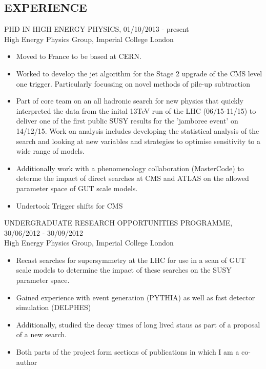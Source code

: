 \documentclass[9pt]{res} %
\begin{document}
\begin{resume}
\section{EXPERIENCE} 
\vspace{0.2cm}
PHD IN HIGH ENERGY PHYSICS, 01/10/2013 - present \\
\vspace{0.1cm}
High Energy Physics Group, Imperial College London 
   \begin{itemize} \itemsep -2pt  %
   \item Moved to France to be based at CERN. 
   \item Worked to develop the jet algorithm for the Stage 2 upgrade of the CMS level one trigger. Particularly focussing on novel methods of pile-up subtraction
   \item Part of core team on an all hadronic search for new physics that quickly interpreted the data from the inital 13TeV run of the LHC (06/15-11/15) to deliver one of the first public SUSY results for the 'jamboree event' on 14/12/15. 
   \itme Work on analysis includes developing the statistical analysis of the search and looking at new variables and strategies to optimise sensitivity to a wide range of models.
   \item Additionally work with a phenomenology collaboration (MasterCode) to determe the impact of direct searches at CMS and ATLAS on the allowed parameter space of GUT scale models.
   \item Undertook Trigger shifts for CMS
 \end{itemize}

UNDERGRADUATE RESEARCH OPPORTUNITIES PROGRAMME, 30/06/2012 - 30/09/2012 \\
\vspace{0.1cm}
High Energy Physics Group, Imperial College London 
   \begin{itemize} \itemsep -2pt  %
   \item Recast searches for supersymmetry at the LHC for use in a scan of GUT scale models to determine the impact of these searches on the SUSY parameter space.
   \item Gained experience with event generation (PYTHIA) as well as fast detector simulation (DELPHES)
   \item Additionally, studied the decay times of long lived staus as part of a proposal of a new search.
   \item Both parts of the project form sections of publications in which I am a co-author
 \end{itemize}


\end{resume}
\end{document}
